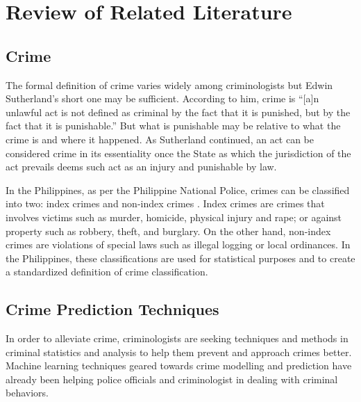 
\chapter{Review of Related Literature}  %

\section{Crime} %
    The formal definition of crime varies widely among criminologists but Edwin Sutherland’s short one may be sufficient. According to him, crime is “[a]n unlawful act is not defined as criminal by the fact that it is punished, but by the fact that it is punishable.” \cite{brown2010criminology} But what is punishable may be relative to what the crime is and where it happened. As Sutherland continued, an act can be considered crime in its essentiality once the State as which the jurisdiction of the act prevails deems such act as an injury and punishable by law.

    In the Philippines, as per the Philippine National Police, crimes can be classified into two: index crimes and non-index crimes \cite{senate2013criminal}. Index crimes are crimes that involves victims such as murder, homicide, physical injury and rape; or against property such as robbery, theft, and burglary. On the other hand, non-index crimes are violations of special laws such as illegal logging or local ordinances. In the Philippines, these classifications are used for statistical purposes and to create a standardized definition of crime classification. \cite{tumulak2015crime}

\section{Crime Prediction Techniques} %
    In order to alleviate crime, criminologists are seeking techniques and methods in criminal statistics and analysis to help them prevent and approach crimes better. Machine learning techniques geared towards crime modelling and prediction have already been helping police officials and criminologist in dealing with criminal behaviors.

